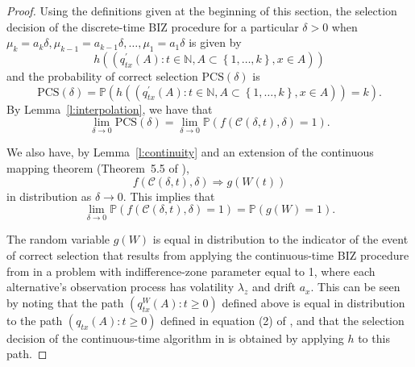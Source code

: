 \documentclass{wscpaperproc}
\theoremstyle{wsc}
\begin{document}
\begin{proof}
Using the definitions given at the beginning of this section,
the selection decision of the discrete-time BIZ procedure for a particular $\delta>0$ when $\mu_{k}=a_{k}\delta,\mu_{k-1}=a_{k-1}\delta,\ldots,\mu_{1}=a_{1}\delta$ is given by
\begin{equation*}
h\left(\left(q_{tx}^{'}\left(A\right):t\in\mathbb{N},A\subset\left\{ 1,\ldots,k\right\} ,x\in A\right)\right)
\end{equation*}
and the probability of correct selection $\mbox{PCS}(\delta)$ is
\begin{equation*}
    \mbox{PCS}(\delta) =  \mathbb{P}\left( h\left( \left(q_{tx}^{'}\left(A\right):t\in\mathbb{N},A\subset\left\{ 1,\ldots,k\right\} ,x\in A\right) \right) =k\right).
\end{equation*}
By Lemma~\ref{l:interpolation}, we have that 
\begin{equation}
\lim_{\delta\to0}
\mbox{PCS}(\delta)
 = \lim_{\delta\rightarrow0}
 \mathbb{P}\left(
 f\left(\mathcal{C}\left(\delta,t\right),\delta\right)=1
 \right).
 \label{eq:convergence1}
\end{equation}

We also have, by Lemma~\ref{l:continuity} and an extension of the continuous mapping theorem (Theorem~5.5 of ), 
\begin{equation*}
    f\left(\mathcal{C}\left(\delta,t\right),\delta\right)\Rightarrow g\left(W\left(t\right)\right)
\end{equation*}
in distribution as $\delta\rightarrow0$.
This implies that
\begin{equation}
\lim_{\delta\rightarrow0}\mathbb{P}\left(f\left(\mathcal{C}\left(\delta,t\right),\delta\right)=1\right)
 = \mathbb{P}\left(g\left(W\right)=1\right).
 \label{eq:convergence2}
\end{equation}

The random variable $g(W)$ is equal in distribution to the indicator of the event of correct selection that results from applying the continuous-time BIZ procedure from  in a problem with indifference-zone parameter equal to 1, where each alternative's observation process has volatility $\lambda_z$ and drift $a_x$.
This can be seen by noting that the path $(q^{W}_{tx}(A) : t\ge0)$ defined above is equal in distribution to the path $(q_{tx}(A) : t\ge0)$ defined in equation (2) of , and that the selection decision of the continuous-time algorithm in  is obtained by applying $h$ to this path.


\end{proof}
\end{document}
